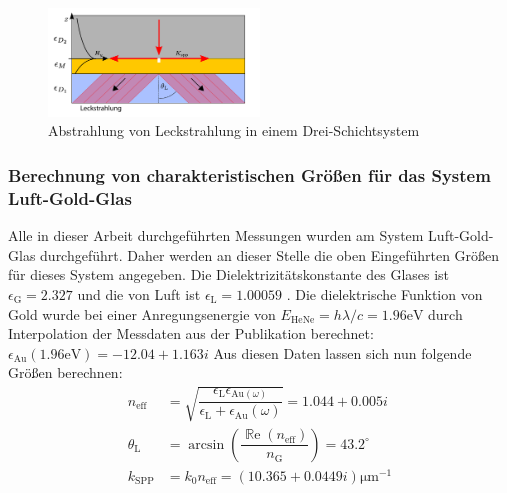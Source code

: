 \documentclass[titlepage]{article}
\renewcommand{\Re}{\operatorname{\mathbb{R}e}}
\begin{document}
			\begin{figure}[h] 
				\centering
				\includegraphics[width=0.5\textwidth]{figures/leckstrahlung.pdf}
				\caption{Abstrahlung von Leckstrahlung in einem Drei-Schichtsystem}
				\label{fig:leakage_radiation}
			\end{figure}
		\subsubsection{Berechnung von charakteristischen Größen für das System Luft-Gold-Glas}
		Alle in dieser Arbeit durchgeführten Messungen wurden am System Luft-Gold-Glas durchgeführt. Daher werden an dieser Stelle die oben Eingeführten Größen für dieses System angegeben. Die Dielektrizitätskonstante des Glases ist $\epsilon_{\mathrm{G}} = 2.327$ \cite{Zeiss.} und die von Luft ist $\epsilon_{\mathrm{L}} = 1.00059$ \cite{Hippel.1995}. Die dielektrische Funktion von Gold wurde bei einer Anregungsenergie von $E_{\mathrm{HeNe}} = h\lambda/c = 1.96\mathrm{eV} $ durch Interpolation der Messdaten aus der Publikation \cite{Olmon.2012} berechnet: $\epsilon_{\mathrm{Au}}(1.96\mathrm{eV}) = -12.04 +1.163i$ Aus diesen Daten lassen sich nun folgende Größen berechnen:
		\begin{subequations}
			\begin{align}
				n_{\mathrm{eff}} &= \sqrt{\dfrac{\epsilon_{\mathrm{L}}\epsilon_{\mathrm{Au}(\omega)}}{\epsilon_{\mathrm{L}} + 	\epsilon_{\mathrm{Au}}(\omega)}} = 	1.044 + 0.005i \label{eq:theo_n_eff}\\			
				\theta_\mathrm{L} &=  \arcsin\left(\dfrac{\Re(n_{\mathrm{eff}})}{ n_\mathrm{G}}\right) = 43.2^\circ 
				\label{eq:theo_theta_l}\\
				k_{\mathrm{SPP}} &= k_0 n_{\mathrm{eff}} = (10.365 + 0.0449i)\mathrm{\mu m}^{-1}\label{eq:theo_k_spp}
			\end{align}
		\end{subequations}
\end{document}
